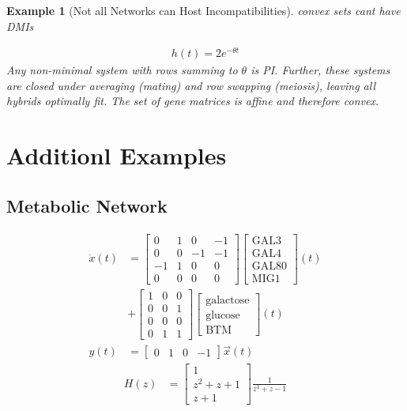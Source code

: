 \documentclass[9 pt]{article}
\newcommand{\1}{\mathbbm{1}}
\newtheorem{example}{Example}
\begin{document}
\begin{multicols}{2}
      \begin{example}[Not all Networks can Host Incompatibilities]
        convex sets cant have DMIs

        \begin{align*}
          h(t) = 2 e^{- \theta t}
        \end{align*}
        Any non-minimal system with rows summing to $\theta$ is PI. Further, these systems are closed under averaging (mating) and row swapping (meiosis), leaving all hybrids optimally fit. The set of gene matrices is affine and therefore convex.  
      \end{example}

  \section*{Additionl Examples}

    \subsection*{Metabolic Network}
  \begin{align*}
    \dot{x}(t) &= \begin{bmatrix} 0 & 1 & 0 & -1 \\ 0 & 0 & -1 & -1 \\ -1 & 1 & 0 & 0 \\ 0 & 0 & 0 & 0 \end{bmatrix} \begin{bmatrix} \text{GAL3} \\ \text{GAL4} \\ \text{GAL80} \\ \text{MIG1} \end{bmatrix}(t) \\ &+ \begin{bmatrix} 1 & 0 & 0 \\ 0 & 0 & 1 \\ 0 & 0 & 0 \\ 0 & 1 & 1 \end{bmatrix} \begin{bmatrix} \text{galactose} \\ \text{glucose} \\ \text{BTM} \end{bmatrix}(t) \\
        y(t) &= \begin{bmatrix} 0 & 1 & 0 & -1 \end{bmatrix} \vec{x}(t)
    \end{align*}
    \begin{align*}
      H(z) &= \begin{bmatrix} 1 \\ z^{2} + z + 1 \\ z + 1 \end{bmatrix} \frac{1}{z^{3} + z -1}
    \end{align*}


\end{multicols}
\end{document}
